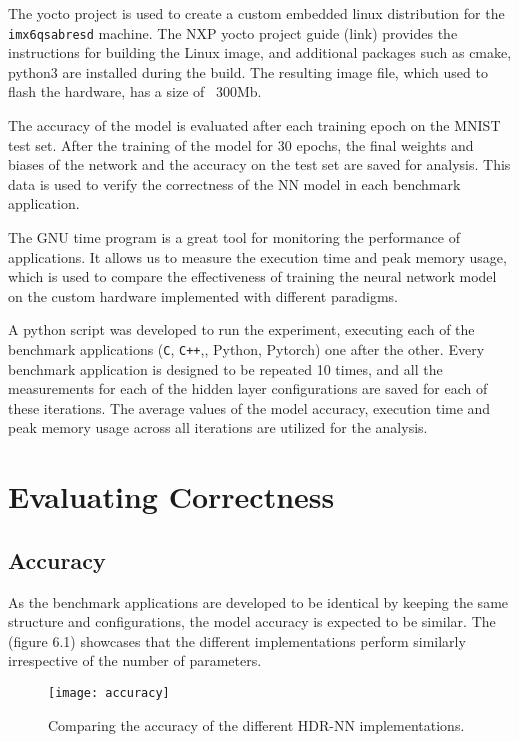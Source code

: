 The yocto project is used to create a custom embedded linux distribution for the \texttt{imx6qsabresd} machine. The NXP yocto project guide (link) provides the instructions for building the Linux image, and additional packages such as cmake, python3 are installed during the build. The resulting image file, which used to flash the hardware, has a size of ~300Mb.

The accuracy of the model is evaluated after each training epoch on the MNIST test set. After the training of the model for 30 epochs, the final weights and biases of the network and the accuracy on the test set are saved for analysis. This data is used to verify the correctness of the NN model in each benchmark application.

The GNU time program is a great tool for monitoring the performance of applications. It allows us to measure the execution time and peak memory usage, which is used to compare the effectiveness of training the neural network model on the custom hardware implemented with different paradigms.

A python script was developed to run the experiment, executing each of the benchmark applications (\verb!C!, \verb!C++!,, Python, Pytorch) one after the other. Every benchmark application is designed to be repeated 10 times, and all the measurements for each of the hidden layer configurations are saved for each of these iterations. The average values of the model accuracy, execution time and peak memory usage across all iterations are utilized for the analysis.



\section{Evaluating Correctness}
\subsection{Accuracy}
As the benchmark applications are developed to be identical by keeping the same structure and configurations, the model accuracy is expected to be similar. The (figure 6.1) showcases that the different implementations perform similarly irrespective of the number of parameters.

\begin{figure}[!ht]
	\centering
	\texttt{[image: accuracy]}
	\caption[HDR-NN Accuracy]{Comparing the accuracy of the different HDR-NN implementations.}
\end{figure}

